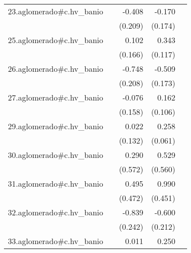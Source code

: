 {\begin{longtable}{l*{4}{D{.}{.}{-1}}}
\addlinespace
23.aglomerado#c.hv\_banio&                     &      -0.408         &      -0.170         &                     \\
            &                     &     (0.209)         &     (0.174)         &                     \\
\addlinespace
25.aglomerado#c.hv\_banio&                     &       0.102         &       0.343\sym{**} &                     \\
            &                     &     (0.166)         &     (0.117)         &                     \\
\addlinespace
26.aglomerado#c.hv\_banio&                     &      -0.748\sym{***}&      -0.509\sym{**} &                     \\
            &                     &     (0.208)         &     (0.173)         &                     \\
\addlinespace
27.aglomerado#c.hv\_banio&                     &      -0.076         &       0.162         &                     \\
            &                     &     (0.158)         &     (0.106)         &                     \\
\addlinespace
29.aglomerado#c.hv\_banio&                     &       0.022         &       0.258\sym{***}&                     \\
            &                     &     (0.132)         &     (0.061)         &                     \\
\addlinespace
30.aglomerado#c.hv\_banio&                     &       0.290         &       0.529         &                     \\
            &                     &     (0.572)         &     (0.560)         &                     \\
\addlinespace
31.aglomerado#c.hv\_banio&                     &       0.495         &       0.990\sym{*}  &                     \\
            &                     &     (0.472)         &     (0.451)         &                     \\
\addlinespace
32.aglomerado#c.hv\_banio&                     &      -0.839\sym{***}&      -0.600\sym{**} &                     \\
            &                     &     (0.242)         &     (0.212)         &                     \\
\addlinespace
33.aglomerado#c.hv\_banio&                     &       0.011         &       0.250\sym{***}&                     \\

\end{longtable}}
